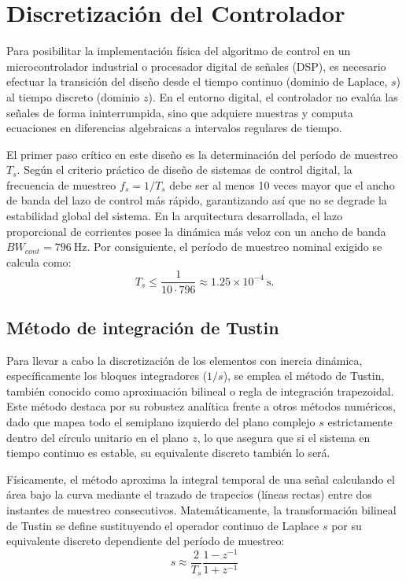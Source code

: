 \documentclass[12pt, a4paper,journal, onecolumn, compsoc]{IEEEtran}
\begin{document}
\section{Discretización del Controlador}

Para posibilitar la implementación física del algoritmo de control en un microcontrolador industrial o procesador digital de señales (DSP), es necesario efectuar la transición del diseño desde el tiempo continuo (dominio de Laplace, $s$) al tiempo discreto (dominio $z$). En el entorno digital, el controlador no evalúa las señales de forma ininterrumpida, sino que adquiere muestras y computa ecuaciones en diferencias algebraicas a intervalos regulares de tiempo.

El primer paso crítico en este diseño es la determinación del período de muestreo $T_s$. Según el criterio práctico de diseño de sistemas de control digital, la frecuencia de muestreo $f_s = 1/T_s$ debe ser al menos 10 veces mayor que el ancho de banda del lazo de control más rápido, garantizando así que no se degrade la estabilidad global del sistema. En la arquitectura desarrollada, el lazo proporcional de corrientes posee la dinámica más veloz con un ancho de banda $BW_{cont} = 796 \ \mathrm{Hz}$. Por consiguiente, el período de muestreo nominal exigido se calcula como:
\begin{equation}
    T_s \leq \frac{1}{10 \cdot 796} \approx 1.25 \times 10^{-4} \ \mathrm{s}.
\end{equation}

\subsection{Método de integración de Tustin}
Para llevar a cabo la discretización de los elementos con inercia dinámica, específicamente los bloques integradores ($1/s$), se emplea el método de Tustin, también conocido como aproximación bilineal o regla de integración trapezoidal. Este método destaca por su robustez analítica frente a otros métodos numéricos, dado que mapea todo el semiplano izquierdo del plano complejo $s$ estrictamente dentro del círculo unitario en el plano $z$, lo que asegura que si el sistema en tiempo continuo es estable, su equivalente discreto también lo será.

Físicamente, el método aproxima la integral temporal de una señal calculando el área bajo la curva mediante el trazado de trapecios (líneas rectas) entre dos instantes de muestreo consecutivos. Matemáticamente, la transformación bilineal de Tustin se define sustituyendo el operador continuo de Laplace $s$ por su equivalente discreto dependiente del período de muestreo:
\begin{equation}
    s \approx \frac{2}{T_s} \frac{1 - z^{-1}}{1 + z^{-1}}
\end{equation}
\end{document}
